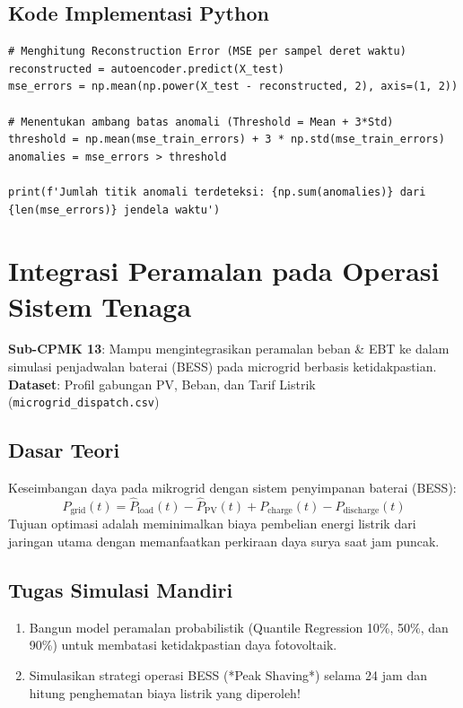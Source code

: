 \documentclass[11pt,a4paper]{report}
\begin{document}
\section{Kode Implementasi Python}
\begin{lstlisting}
# Menghitung Reconstruction Error (MSE per sampel deret waktu)
reconstructed = autoencoder.predict(X_test)
mse_errors = np.mean(np.power(X_test - reconstructed, 2), axis=(1, 2))

# Menentukan ambang batas anomali (Threshold = Mean + 3*Std)
threshold = np.mean(mse_train_errors) + 3 * np.std(mse_train_errors)
anomalies = mse_errors > threshold

print(f'Jumlah titik anomali terdeteksi: {np.sum(anomalies)} dari {len(mse_errors)} jendela waktu')
\end{lstlisting}

\newpage

\chapter{Integrasi Peramalan pada Operasi Sistem Tenaga}

\begin{tcolorbox}[title=Informasi Modul 13 \& 14]
\textbf{Sub-CPMK 13}: Mampu mengintegrasikan peramalan beban \& EBT ke dalam simulasi penjadwalan baterai (BESS) pada microgrid berbasis ketidakpastian.\\
\textbf{Dataset}: Profil gabungan PV, Beban, dan Tarif Listrik (\texttt{microgrid\_dispatch.csv})
\end{tcolorbox}

\section{Dasar Teori}
Keseimbangan daya pada mikrogrid dengan sistem penyimpanan baterai (BESS):
\begin{equation}
    P_{\text{grid}}(t) = \hat{P}_{\text{load}}(t) - \hat{P}_{\text{PV}}(t) + P_{\text{charge}}(t) - P_{\text{discharge}}(t)
\end{equation}
Tujuan optimasi adalah meminimalkan biaya pembelian energi listrik dari jaringan utama dengan memanfaatkan perkiraan daya surya saat jam puncak.

\section{Tugas Simulasi Mandiri}
\begin{enumerate}
    \item Bangun model peramalan probabilistik (Quantile Regression 10\%, 50\%, dan 90\%) untuk membatasi ketidakpastian daya fotovoltaik.
    \item Simulasikan strategi operasi BESS (*Peak Shaving*) selama 24 jam dan hitung penghematan biaya listrik yang diperoleh!
\end{enumerate}
\end{document}
